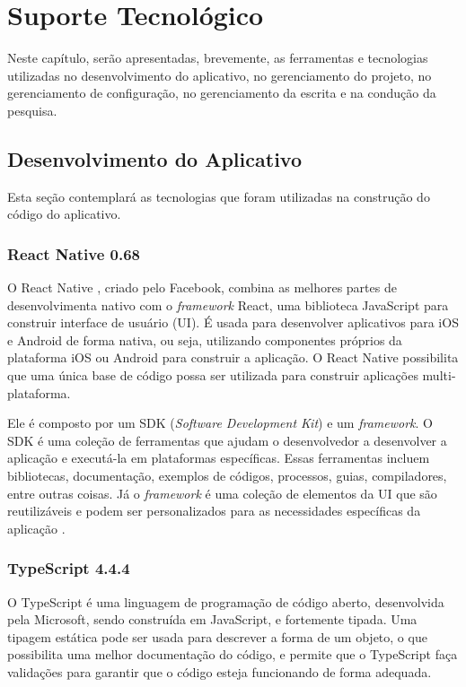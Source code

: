 \chapter[Suporte Tecnológico]{Suporte Tecnológico}
\label{ch:suporte}

Neste capítulo, serão apresentadas, brevemente, as ferramentas e tecnologias 
utilizadas no desenvolvimento do aplicativo, no gerenciamento 
do projeto, no gerenciamento de configuração, no gerenciamento da 
escrita e na condução da pesquisa.


\section{Desenvolvimento do Aplicativo}

Esta seção contemplará as tecnologias que foram utilizadas na construção do 
código do aplicativo.

\subsection{React Native 0.68}

O React Native \cite{reactNative}, criado pelo Facebook, combina as melhores partes de 
desenvolvimenta nativo com 
o \emph{framework} React, uma biblioteca JavaScript para construir interface de usuário (UI). 
É usada para desenvolver aplicativos para iOS e Android de forma nativa, ou seja, utilizando 
componentes próprios da plataforma iOS ou Android para construir a aplicação. O React Native 
possibilita que uma única base de código possa ser utilizada para construir aplicações 
multi-plataforma.

Ele é composto por um SDK (\emph{Software Development Kit}) e um
\emph{framework}. O SDK é uma coleção de ferramentas que ajudam
o desenvolvedor a desenvolver a aplicação e executá-la em
plataformas específicas. Essas ferramentas incluem bibliotecas,
documentação, exemplos de códigos, processos, guias,
compiladores, entre outras coisas. Já o \emph{framework} é
uma coleção de elementos da UI que são reutilizáveis e podem
ser personalizados para as necessidades específicas da
aplicação \cite{reactNative}.

\subsection{TypeScript 4.4.4}

O TypeScript \cite{typescript} é uma linguagem de programação de código aberto, desenvolvida 
pela Microsoft, sendo construída em JavaScript, e fortemente tipada. Uma tipagem estática pode 
ser usada para descrever a forma de um objeto, o que possibilita uma melhor documentação do 
código, e permite que o TypeScript faça validações para garantir que o código esteja funcionando 
de forma adequada.


